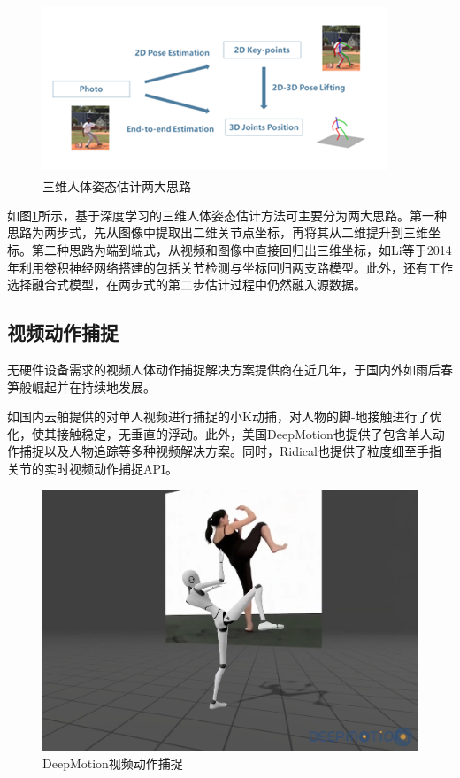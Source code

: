 \begin{figure}[h]
	\centering
	\includegraphics[scale=1.3]{figures/6.png}
	\caption{三维人体姿态估计两大思路\textsuperscript{\cite{p20}}}
	\label{fig:f6}
\end{figure}

如图\ref{fig:f6}所示，基于深度学习的三维人体姿态估计方法可主要分为两大思路。第一种思路为两步式，先从图像中提取出二维关节点坐标，再将其从二维提升到三维坐标。第二种思路为端到端式，从视频和图像中直接回归出三维坐标，如Li等于2014年利用卷积神经网络搭建的包括关节检测与坐标回归两支路模型。此外，还有工作选择融合式模型，在两步式的第二步估计过程中仍然融入源数据。

\subsection{视频动作捕捉}{}
无硬件设备需求的视频人体动作捕捉解决方案提供商在近几年，于国内外如雨后春笋般崛起并在持续地发展。

如国内云舶提供的对单人视频进行捕捉的小K动捕，对人物的脚-地接触进行了优化，使其接触稳定，无垂直的浮动。此外，美国DeepMotion也提供了包含单人动作捕捉以及人物追踪等多种视频解决方案。同时，Ridical也提供了粒度细至手指关节的实时视频动作捕捉API。

\begin{figure}[h]
	\centering
	\includegraphics[scale=0.4]{figures/7.png}
	\caption{DeepMotion视频动作捕捉}
	\label{fig:f7}
\end{figure}



